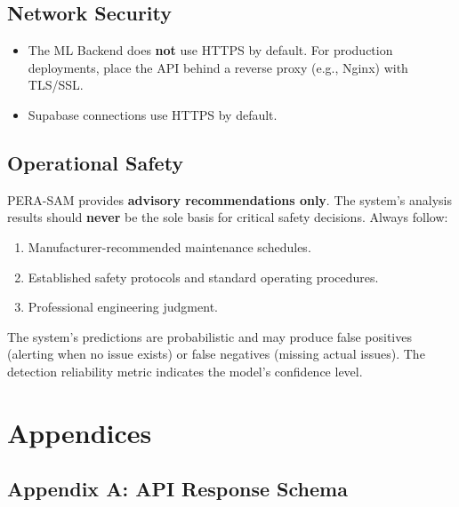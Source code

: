 \documentclass[10pt, a4paper, oneside]{report}
\begin{document}
\section{Network Security}

\begin{itemize}[leftmargin=*, nosep]
  \item The ML Backend does \textbf{not} use HTTPS by default. For production deployments, place the API behind a reverse proxy (e.g., Nginx) with TLS/SSL.
  \item Supabase connections use HTTPS by default.
\end{itemize}

\section{Operational Safety}

\begin{dangerbox}
PERA-SAM provides \textbf{advisory recommendations only}. The system's analysis results should \textbf{never} be the sole basis for critical safety decisions. Always follow:
\begin{enumerate}[leftmargin=*, nosep]
  \item Manufacturer-recommended maintenance schedules.
  \item Established safety protocols and standard operating procedures.
  \item Professional engineering judgment.
\end{enumerate}
The system's predictions are probabilistic and may produce false positives (alerting when no issue exists) or false negatives (missing actual issues). The detection reliability metric indicates the model's confidence level.
\end{dangerbox}


\chapter{Appendices}
\label{ch:appendices}

\section*{Appendix A: API Response Schema}
\label{sec:appendix-a}
\end{document}
